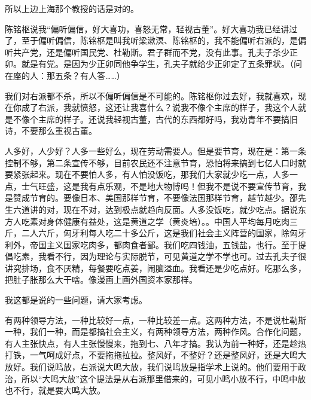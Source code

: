 所以上边上海那个教授的话是对的。

陈铭枢说我“偏听偏信，好大喜功，喜怒无常，轻视古董”。好大喜功我已经讲过了，至于偏听偏信，陈铭枢是叫我听梁漱溟、陈铭枢的，我不能偏听右派的，是偏听共产党，还是偏听国民党、杜勒斯。君子群而不党，没有此事。孔夫子杀少正卯。就是有党。是因为少正卯同他争学生，孔夫子就给少正卯定了五条罪状。（问在座的人：那五条？有人答……）

我们对右派都不杀，所以不偏听偏信是不可能的。陈铭枢你过去好，我就喜欢，现在你成了右派，我就愤怒，这还让我喜什么？说我不像个主席的样子，我这个人就是不像个主席的样子。还说我轻视古董，古代的东西都好吗，我劝青年不要搞旧诗，不要那么重视古董。


人多好，人少好？人多一些好么，现在劳动需要人。但是要节育，现在是：第一条控制不够，第二条宣传不够，目前农民还不注意节育，恐怕将来搞到七亿人口时就要紧张起来。现在不要怕人多，有人怕没饭吃，那我们大家就少吃一点，人多一点，士气旺盛，这是我有点乐观，不是地大物博吗！但我不是说不要宣传节育，我是赞成节育的。要像日本、美国那样节育，不要像法国那样节育，越节越少。邵先生六道讲的对，现在不对，达到极点就趋向反面。人多没饭吃，就少吃点。据说东方人吃素对身体健康有益处，这是黄道之学（黄炎培）。。中国人平均每月吃肉三斤，二人六斤，匈牙利每人吃二十多公斤，这是我们社会主义阵营的国家，除匈牙利外，帝国主义国家吃肉多，都肉食者鄙。我们吃四钱油，五钱盐，也行。至于提倡吃素，我看不行，因为理论与实际脱节，可见黄道之学不学也可。过去孔夫子很讲究排场，食不厌精，每餐要吃点姜，闹脑溢血。我看还是少吃点好。吃那么多，把肚子胀那么大干啥。像漫画上画外国资本家那样。

我这都是说的一些问题，请大家考虑。

有两种领导方法，一种比较好一点，一种比较差一点。这两种方法，不是说杜勒斯一种，我们一种，而是都搞社会主义，有两种领导方法，两种作风。合作化问题，有人主张快点，有人主张慢慢来，拖到七、八年才搞。我认为前一种好，还是趁热打铁，一气呵成好点，不要拖拖拉拉。整风好，不整好？还是整风好，还是大鸣大放好。我们说鸣放，右派说大鸣大放，我们说鸣放是指学术上说的。他们要用于政治，所以“大鸣大放”这个提法是从右派那里借来的，可见小鸣小放不行，中鸣中放也不行，就是要大鸣大放。

